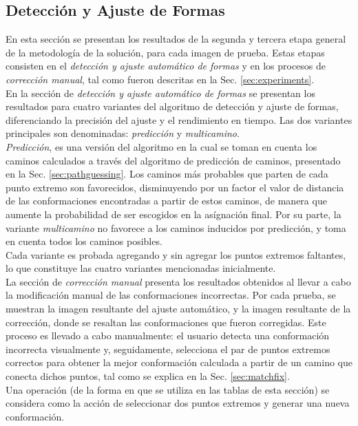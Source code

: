 \subsection{Detecci\'on y Ajuste de Formas}

En esta secci\'on se presentan los resultados de la segunda y tercera
etapa general de la metodolog\'ia de la soluci\'on, para cada imagen de prueba.
Estas etapas consisten en el \emph{detecci\'on y ajuste autom\'atico de formas} y en los procesos 
de \emph{correcci\'on manual}, tal como fueron descritas en la Sec. \ref{sec:experiments}.\\

En la secci\'on de \emph{detecci\'on y ajuste autom\'atico de formas} se presentan los resultados
para cuatro variantes del algoritmo de detecci\'on y ajuste de formas, diferenciando
la precisi\'on del ajuste y el rendimiento en tiempo. Las dos variantes principales
son denominadas: \emph{predicci\'on} y \emph{multicamino}.\\
\emph{Predicci\'on}, es una versi\'on del algoritmo en la cual se toman en cuenta 
los caminos calculados a trav\'es del algoritmo de predicci\'on de caminos, presentado
en la Sec. \ref{sec:pathguessing}. Los caminos m\'as probables que parten de cada punto
extremo son favorecidos, disminuyendo por un factor el valor de distancia de las
conformaciones encontradas a partir de estos caminos, de manera que aumente la 
probabilidad de ser escogidos en la as\'ignaci\'on final. Por su parte, la variante 
\emph{multicamino} no favorece a los caminos inducidos por predicci\'on, y toma 
en cuenta todos los caminos posibles.\\
Cada variante es probada agregando y sin agregar los puntos extremos faltantes, lo
que constituye las cuatro variantes mencionadas inicialmente.\\

La secci\'on de \emph{correcci\'on manual} presenta los resultados obtenidos 
al llevar a cabo la modificaci\'on manual de las conformaciones incorrectas.
Por cada prueba, se muestran la imagen resultante del ajuste autom\'atico, 
y la imagen resultante de la correcci\'on, donde se resaltan las conformaciones
que fueron corregidas. Este proceso es llevado a cabo manualmente: el usuario
detecta una conformaci\'on incorrecta visualmente y, seguidamente, selecciona el
par de puntos extremos correctos para obtener la mejor conformaci\'on
calculada a partir de un camino que conecta dichos puntos, 
tal como se explica en la Sec. \ref{sec:matchfix}.\\
Una operaci\'on (de la forma en que se utiliza en las tablas de esta secci\'on)
se considera como la acci\'on de seleccionar dos puntos extremos y generar
una nueva conformaci\'on.\\

